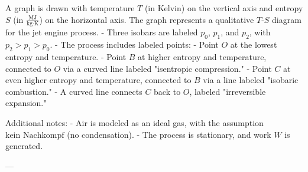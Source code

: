A graph is drawn with temperature \( T \) (in Kelvin) on the vertical axis and entropy \( S \) (in \( \frac{\text{MJ}}{\text{kg·K}} \)) on the horizontal axis. The graph represents a qualitative \( T \)-\( S \) diagram for the jet engine process.  
- Three isobars are labeled \( p_0 \), \( p_1 \), and \( p_2 \), with \( p_2 > p_1 > p_0 \).  
- The process includes labeled points:  
  - Point \( O \) at the lowest entropy and temperature.  
  - Point \( B \) at higher entropy and temperature, connected to \( O \) via a curved line labeled "isentropic compression."  
  - Point \( C \) at even higher entropy and temperature, connected to \( B \) via a line labeled "isobaric combustion."  
  - A curved line connects \( C \) back to \( O \), labeled "irreversible expansion."  

Additional notes:  
- Air is modeled as an ideal gas, with the assumption \( \text{kein Nachkompf} \) (no condensation).  
- The process is stationary, and work \( W \) is generated.  

---